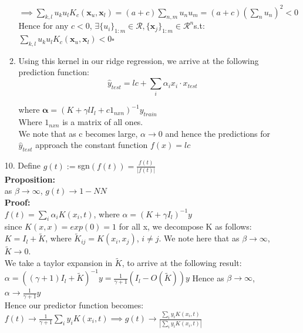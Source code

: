 \documentclass[12pt]{article}
\begin{document}
\begin{enumerate}[leftmargin=\labelsep]
\begin{enumerate}
        $\implies \sum_{k,l} u_{k}u_{l}K_{c}(\textbf{x}_{u},\textbf{x}_{l}) = (a+c) \sum_{n,m}u_{n}u_{m} = (a + c)(\sum_{n}u_{n})^{2} < 0$\\
        Hence for any $c < 0$, $
        \exists \{ u_{i} \}_{1:m} \in \mathcal{R},
         \{ \textbf{x}_{j}\}_{1:m} \in \mathcal{R}^{n}$s.t:\\
           $\sum_{k,l} u_{k}u_{l}K_{c}(\textbf{x}_{u},\textbf{x}_{l}) < 0
        \square$
              \item Using this kernel in our ridge regression, we arrive at the following prediction function:
    \\
    \[\hat{y}_{test} = lc + \sum_{i} \alpha_{i} x_{i} \cdot x_{test} \]

    where $\mathbf{\alpha} = ( K + \gamma l I_{l} + c 1_{nxn}) ^{-1} y_{train}$\\
    Where $1_{nxn}$ is a matrix of all ones.\\

    We note that as c becomes large, $\alpha \to 0$ and hence the predictions for $\hat{y}_{test}$ approach
    the constant function $f(x) = lc$
\end{enumerate}

\newpage
\item[10.]  Define $g(t) := $sgn$(f(t)) = \frac{f(t)}{| f(t)|}$\\
    \textbf{Proposition:}\\
    
    as $\beta \to \infty$, $g(t) \to 1-NN$\\
    
    \textbf{Proof:}\\
    
    $f(t) = \sum_{i} \alpha_{i} K(x_{i}, t)$, where $ \alpha = (K + \gamma I_{l})^{-1} y$\\
    
    since $K(x,x) = exp(0) = 1$ for  all x, we decompose K as follows:\\
    
    $K = I_{l} + \tilde{K}$, where $\tilde{K}_{ij} = K(x_i, x_j)$, $i \ne j$. We note here that as $\beta \to \infty$, $ \tilde{K} \to 0$.\\
    
    We take a taylor expansion in $\tilde{K}$, to arrive at the following result:\\
    
    $\alpha = ((\gamma+1) I_{l} + \tilde{K})^{-1} y = \frac{1}{\gamma + 1} (I_{l} - O(\tilde{K})) y $
    Hence as $\beta \to \infty$, $\alpha \to \frac{1}{\gamma +1}y$\\
    Hence our predictor function becomes:\\
    $f(t) \to \frac{1}{\gamma+1} \sum_{i} y_{i} K(x_{i}, t) \implies g(t)  \to \frac{\sum_{i} y_{i} K(x_{i}, t)}{|\sum_{i} y_{i} K(x_{i}, t)|}
    $\\


\end{enumerate}
\end{document}
